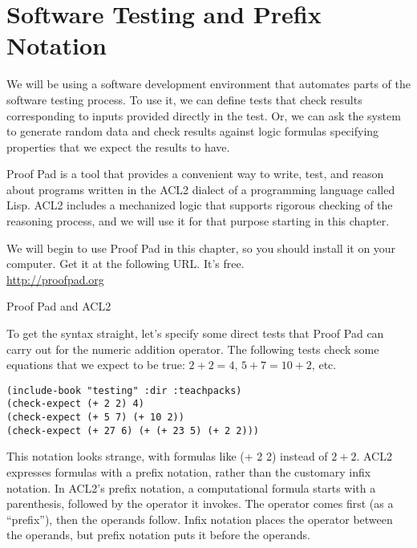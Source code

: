 \chapter{Software Testing and Prefix Notation}
\label{ch:software-testing-prefix-notation}


We will be using a software development environment that automates parts of the software testing process.
To use it, we can define tests that check results corresponding to inputs provided directly in the test.
Or, we can ask the system to generate random data and
check results against logic formulas specifying properties that we expect the results to have.

\begin{aside}
Proof Pad is a tool that provides a convenient way
to write, test, and reason about programs
written in the ACL2 dialect of a programming language called Lisp.
ACL2 includes a mechanized logic that
supports rigorous checking of the reasoning process,
and we will use it for that purpose starting in this chapter.

We will begin to use Proof Pad in this chapter,
so you should install it on your computer.
Get it at the following URL. It's free.\\ 
\hspace*{38mm}\url{http://proofpad.org}

\caption{Proof Pad and ACL2}
\label{aside:proof-pad}
\end{aside}

To get the syntax straight, 
let's specify some direct tests that Proof Pad
can carry out for the numeric addition operator.
The following tests check some equations that we expect to be true:
$2 + 2 = 4$, $5 + 7 = 10 + 2$, etc.

\begin{Verbatim}
(include-book "testing" :dir :teachpacks)
(check-expect (+ 2 2) 4)
(check-expect (+ 5 7) (+ 10 2))
(check-expect (+ 27 6) (+ (+ 23 5) (+ 2 2)))
\end{Verbatim}

This notation looks strange, with formulas like \textsf{(+ 2 2)} instead of $2 + 2$.
ACL2 expresses formulas with a 
prefix notation,
rather than the customary infix notation.
In ACL2's prefix notation, a computational 
formula starts with a parenthesis,
followed by the operator it invokes.
The operator comes first (as a ``prefix''), then the operands follow.
Infix notation places the operator between the operands,
but prefix notation puts it before the operands.

